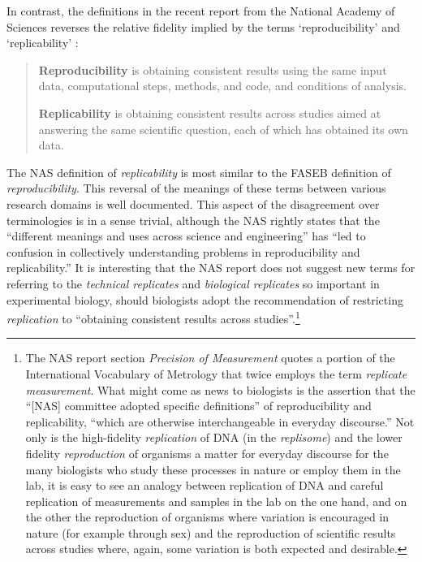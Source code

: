        In contrast, the definitions in the recent report from the National Academy of Sciences reverses the relative fidelity implied by the terms `reproducibility' and `replicability' \cite[p.4]{committeeonreproducibilityandreplicabilityinscience2019reproducibility}: \begin{quote}
	\textbf{Reproducibility} is obtaining consistent results using the same input data, computational
	steps, methods, and code, and conditions of analysis.  \medskip

	\textbf{Replicability} is obtaining consistent results across studies aimed at answering the same
	scientific question, each of which has obtained its own data.
\end{quote}
      
The NAS definition of \emph{replicability} is most similar to the FASEB definition of \emph{reproducibility}.
This reversal of the meanings of these terms between various research domains is well documented.
This aspect of the disagreement over terminologies is in a sense trivial, although the NAS rightly 
	states that the ``different meanings and uses across science and engineering'' has ``led to confusion in collectively 
	understanding problems in reproducibility and replicability.''
It is interesting that the NAS report does not suggest new terms for referring to the \emph{technical replicates} 
	and  \emph{biological replicates} so important in experimental biology, should biologists adopt the recommendation 
	of restricting \emph{replication} to ``obtaining consistent results across studies''.\footnote{The NAS report section \emph{Precision of Measurement} quotes a portion of the International Vocabulary of
	Metrology that twice employs the term \emph{replicate measurement}.
What might come as news to biologists is the assertion that the ``[NAS] committee adopted specific definitions'' of 
	reproducibility and replicability, ``which are otherwise interchangeable in everyday discourse.''
Not only is the high-fidelity \emph{replication} of DNA (in the \emph{replisome}) and the lower fidelity \emph{reproduction}
of organisms a matter for everyday discourse for the many biologists who study these processes in nature or employ them in the lab,
	it is easy to see an analogy between replication of DNA and careful replication of measurements and samples
	in the lab on the one hand, and on the other the reproduction of organisms where variation is encouraged in nature
	(for example through sex) and the reproduction of scientific results across studies where, again, some variation is both 
	expected and desirable.}

